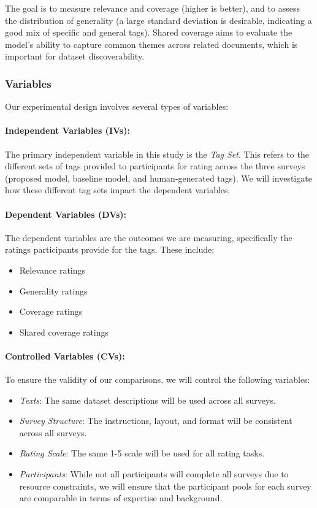 The goal is to measure relevance and coverage (higher is better), and to assess the distribution of generality (a large standard deviation is desirable, indicating a good mix of specific and general tags). Shared coverage aims to evaluate the model's ability to capture common themes across related documents, which is important for dataset discoverability.


\subsubsection{Variables}
Our experimental design involves several types of variables:

\paragraph{Independent Variables (IVs):}
The primary independent variable in this study is the \textit{Tag Set}. This refers to the different sets of tags provided to participants for rating across the three surveys (proposed model, baseline model, and human-generated tags). We will investigate how these different tag sets impact the dependent variables.

\paragraph{Dependent Variables (DVs):}
The dependent variables are the outcomes we are measuring, specifically the ratings participants provide for the tags. These include:
\begin{itemize}
\item Relevance ratings
\item Generality ratings
\item Coverage ratings
\item Shared coverage ratings
\end{itemize}

\paragraph{Controlled Variables (CVs):}
To ensure the validity of our comparisons, we will control the following variables:
\begin{itemize}
\item \textit{Texts}: The same dataset descriptions will be used across all surveys.
\item \textit{Survey Structure}: The instructions, layout, and format will be consistent across all surveys.
\item \textit{Rating Scale}: The same 1-5 scale will be used for all rating tasks.
\item \textit{Participants}: While not all participants will complete all surveys due to resource constraints, we will ensure that the participant pools for each survey are comparable in terms of expertise and background.
\end{itemize}

